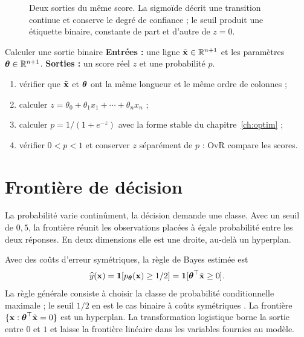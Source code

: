 \begin{figure}[htbp]
\centering
{}
\caption{Deux sorties du même score. La sigmoïde décrit une transition continue et
conserve le degré de confiance ; le seuil produit une étiquette binaire, constante
de part et d'autre de $z=0$.}
\label{fig:sigmoid-threshold}
\end{figure}

\begin{procedure}{Calculer une sortie binaire}
\textbf{Entrées :} une ligne $\tilde{\mathbf{x}}\in\mathbb{R}^{n+1}$ et les paramètres
$\boldsymbol{\theta}\in\mathbb{R}^{n+1}$. \textbf{Sorties :} un score réel $z$ et une probabilité $p$.
\begin{enumerate}
  \item vérifier que $\tilde{\mathbf{x}}$ et $\boldsymbol{\theta}$ ont la même longueur et le même ordre de colonnes ;
  \item calculer $z=\theta_0+\theta_1x_1+\cdots+\theta_nx_n$ ;
  \item calculer $p=1/(1+e^{-z})$ avec la forme stable du chapitre~\ref{ch:optim} ;
  \item vérifier $0<p<1$ et conserver $z$ séparément de $p$ : OvR compare les scores.
\end{enumerate}
\end{procedure}

\section{Frontière de décision}

\begin{lecture}
La probabilité varie continûment, la décision demande une classe. Avec un seuil
de $0{,}5$, la frontière réunit les observations placées à égale probabilité
entre les deux réponses. En deux dimensions elle est une droite, au-delà un
hyperplan.
\end{lecture}

Avec des coûts d'erreur symétriques, la règle de Bayes estimée est
\[
  \widehat y(\mathbf{x})=\mathbf{1}[p_{\boldsymbol{\theta}}(\mathbf{x})\geq 1/2]
  =\mathbf{1}[\boldsymbol{\theta}^\top\tilde{\mathbf{x}}\geq0].
\]
La règle générale consiste à choisir la classe de probabilité conditionnelle
maximale ; le seuil $1/2$ en est le cas binaire à coûts symétriques
\cite[sec.~2.4]{hastie2009}.
La frontière $\{\mathbf{x}:\boldsymbol{\theta}^\top\tilde{\mathbf{x}}=0\}$ est un hyperplan. La transformation
logistique borne la sortie entre $0$ et $1$ et laisse la frontière linéaire dans
les variables fournies au modèle.

